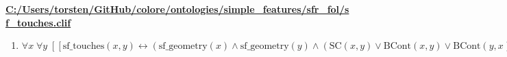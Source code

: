 \documentclass{article}
\begin{document}
\textbf{\url{C:/Users/torsten/GitHub/colore/ontologies/simple\_features/sfr\_fol/sf\_touches.clif}}

\begin{enumerate}
\item $\forall x\; \forall y\;  \left[ \left[ \textrm{sf\_touches}(x,y) \leftrightarrow \left(\textrm{sf\_geometry}(x) \land \textrm{sf\_geometry}(y) \land \left(\textrm{SC}(x,y) \lor \textrm{BCont}(x,y) \lor \textrm{BCont}(y,x)\right)\right) \right] \right]$
\end{enumerate}
\end{document}
